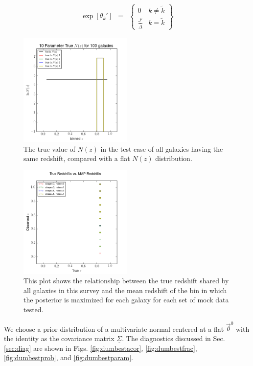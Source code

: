 \documentclass[preprint]{aastex}
\newcommand{\textul}{\underline}
\begin{document}
\begin{eqnarray}
\label{eq:faketheta}
\exp[\theta_{k}'] &=& \left\{\begin{array}{cc}0&k\neq\tilde{k}\\ \frac{J'}{\bar{\Delta}}&k=\tilde{k}\end{array}\right\}
\end{eqnarray}

\begin{figure}
\includegraphics[width=0.5\textwidth]{trueNz-toy.png}
\caption{The true value of $N(z)$ in the test case of all galaxies having the same redshift, compared with a flat $N(z)$ distribution.}
\label{fig:deltatrueNz}
\end{figure}

\begin{figure}
\includegraphics[width=0.5\textwidth]{truevmap-toy.png}
\caption{This plot shows the relationship between the true redshift shared by all galaxies in this survey and the mean redshift of the bin in which the posterior is maximized for each galaxy for each set of mock data tested.}
\label{fig:toycat}
\end{figure}

We choose a prior distribution of a multivariate normal centered at a flat $\vec{\theta}^{0}$ with the identity as the covariance matrix $\textul{\Sigma}$.  The diagnostics discussed in Sec. \ref{sec:diag} are shown in Figs. \ref{fig:dumbestacor}, \ref{fig:dumbestfrac}, \ref{fig:dumbestprob}, and \ref{fig:dumbestparam}.%
\end{document}
